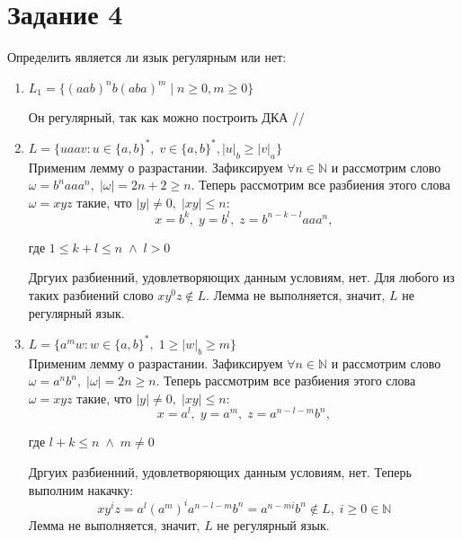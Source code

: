 \documentclass{article}
\begin{document}
    \section*{Задание 4}
    Определить является ли язык регулярным или нет:
    \begin{enumerate}
     \item   \(L_1 = \{(aab)^nb(aba)^m \mid n \geq 0 , m \geq 0\}\) \\
      \begin{center}
            \begin{figure}[htbp]
                \centering
                
            \end{figure}
        \end{center}  

    Он регулярный, так как можно построить ДКА
    //
  \item \(L = \{uaav : u \in \{a, b\}^*, \; v \in \{a, b\}^*, |u|_b \geqslant |v|_a\}\)\\
        Применим лемму о разрастании. Зафиксируем \(\forall n \in \mathbb{N} \) и рассмотрим слово \(\omega = b^{n}aaa^{n}, \; |\omega| = 2n + 2 \geq n\). Теперь рассмотрим все разбиения этого слова \(\omega = xyz\) такие, что \(|y| \neq 0, \; |xy| \leq n\):
        $$x = b^{k}, \; y = b^{l}, \; z = b^{n - k - l}aaa^n,$$ \begin{center}
            где \(1 \leq k + l \leq n \; \wedge \; l > 0\)
        \end{center} 
        Дргуих разбиенний, удовлетворяющих данным условиям, нет.
        Для любого из таких разбиений слово \(xy^0z \notin L\). Лемма не выполняется, значит, \(L\) не регулярный язык.
        
        \item \(L = \{a^mw : w \in \{a, b\}^{*}, \; 1 \geqslant |w|_b \geqslant m\}\)\\
        Применим лемму о разрастании. Зафиксируем \(\forall n \in \mathbb{N} \) и рассмотрим слово \(\omega = a^nb^n, \; |\omega| = 2n \geqslant n\). Теперь рассмотрим все разбиения этого слова \(\omega = xyz\) такие, что \(|y| \neq 0, \; |xy| \leq n\):
        $$x = a^{l}, \; y = a^{m}, \; z = a^{n-l-m}b^{n},$$ 
        \begin{center}
            где \(l + k \leqslant n \; \wedge \; m \ne 0\)
        \end{center} 
        Дргуих разбиенний, удовлетворяющих данным условиям, нет. Теперь выполним накачку: 
        $$xy^{i}z = a^{l}(a^{m})^{i}a^{n-l-m}b^{n} = a^{n-mi}b^{n} \notin L, \; i 
        \geqslant 0 \in \mathbb{N} $$
        Лемма не выполняется, значит, \(L\) не регулярный язык.
        

\end{enumerate}
\end{document}
